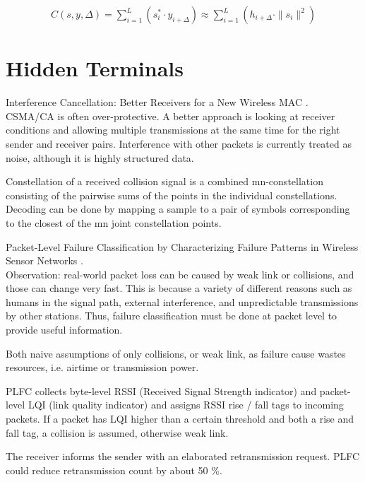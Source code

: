 \begin{align}
	C(s,y,\Delta) = \sum_{i=1}^L (s_i^* \cdot y_{i+\Delta}) \approx \sum_{i=1}^L (h_{i+\Delta} \cdot \|s_i\|^2)
	\label{eqn:correlation}
\end{align}



\section{Hidden Terminals}

Interference Cancellation: Better Receivers for a New Wireless MAC \cite{halperin2007}.\\

CSMA/CA is often over-protective. A better approach is looking at receiver conditions and allowing multiple transmissions at the same time for the right sender and receiver pairs. Interference with other packets is currently treated as noise, although it is highly structured data.

Constellation of a received collision signal is a combined mn-constellation consisting of the pairwise sums of the points in the individual constellations. Decoding can be done by mapping a sample to a pair of symbols corresponding to the closest of the mn joint constellation points.

Packet-Level Failure Classification by Characterizing Failure Patterns in Wireless Sensor Networks \cite{zhu2016}.\\

Observation: real-world packet loss can be caused by weak link or collisions, and those can change very fast. This is because a variety of different reasons such as humans in the signal path, external interference, and unpredictable transmissions by other stations. Thus, failure classification must be done at packet level to provide useful information.

Both naive assumptions of only collisions, or weak link, as failure cause wastes resources, i.e. airtime or transmission power.

PLFC collects byte-level RSSI (Received Signal Strength indicator) and packet-level LQI (link quality indicator) and assigns RSSI rise / fall tags to incoming packets. If a packet has LQI higher than a certain threshold and both a rise and fall tag, a collision is assumed, otherwise weak link.

The receiver informs the sender with an elaborated retransmission request. PLFC could reduce retransmission count by about 50 \%.

